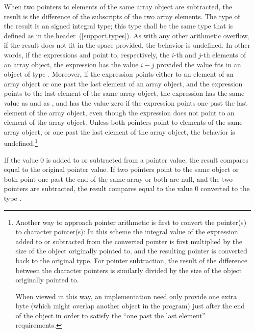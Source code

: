 \pnum
{}%
%
%
%
%
When two pointers to elements of the same array object are subtracted,
the result is the difference of the subscripts of the two array
elements. The type of the result is an  signed
integral type; this type shall be the same type that is defined as
 in the 
header~(\ref{support.types}). As with any other arithmetic overflow, if
the result does not fit in the space provided, the behavior is
undefined. In other words, if the expressions  and 
point to, respectively, the $i$-th and $j$-th elements of an array
object, the expression  has the value $i-j$ provided the
value fits in an object of type . Moreover, if the
expression  points either to an element of an array object or
one past the last element of an array object, and the expression
 points to the last element of the same array object, the
expression  has the same value as 
and as , and has the value zero if the expression
 points one past the last element of the array object, even
though the expression  does not point to an element of the
array object. Unless both pointers point to elements of the same array
object, or one past the last element of the array object, the behavior
is undefined.\footnote{Another way to approach pointer arithmetic is first to convert the
pointer(s) to character pointer(s): In this scheme the integral value of
the expression added to or subtracted from the converted pointer is
first multiplied by the size of the object originally pointed to, and
the resulting pointer is converted back to the original type. For
pointer subtraction, the result of the difference between the character
pointers is similarly divided by the size of the object originally
pointed to.

When viewed in this way, an implementation need only provide one extra
byte (which might overlap another object in the program) just after the
end of the object in order to satisfy the ``one past the last element''
requirements.}

\pnum
If the value 0 is added to or subtracted from a pointer value, the
result compares equal to the original pointer value. If two pointers
point to the same object or both point one past the end of the same
array or both are null, and the two pointers are subtracted, the result
compares equal to the value 0 converted to the type
.


